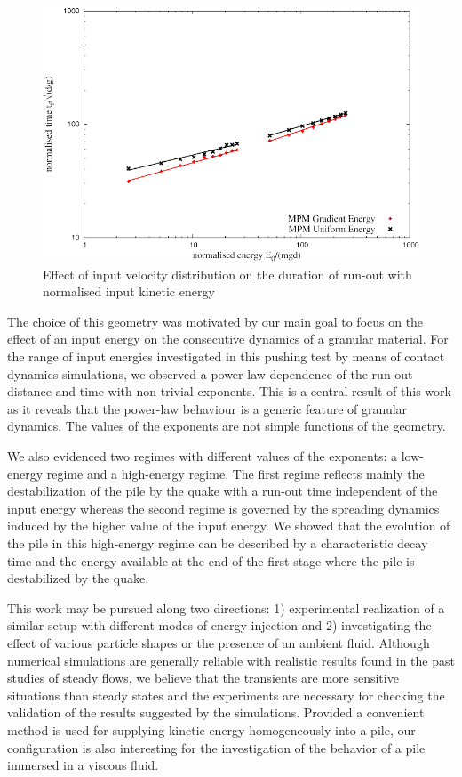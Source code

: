 \begin{figure}[tbph]
\centering
\includegraphics[width=\textwidth]{time_Eo_GU}
\caption{Effect of input velocity distribution on the duration of run-out with 
normalised input kinetic energy}
\label{fig:time_Eo_GU}
\end{figure}



The choice of this geometry was motivated by our main goal  to focus on the 
effect of an input energy on the consecutive dynamics of a granular material.
For the range of input energies investigated in this pushing test by means of 
contact dynamics simulations, we observed a power-law dependence of the 
run-out distance and time with non-trivial exponents. This is a central result 
of this work as it reveals that the power-law behaviour is a generic feature of 
granular dynamics. The values of the exponents are not simple functions of 
the geometry. 

We also evidenced two regimes with different values of the exponents: 
a low-energy regime and a high-energy regime. The first regime  
reflects mainly the destabilization of the pile by the quake with a run-out time 
independent of the input energy whereas the second regime is governed by the 
spreading dynamics induced by the higher value of the input energy. We showed 
that the evolution of the pile in this high-energy regime can be described by a 
characteristic decay time and the energy available at the end of the first 
stage where the pile is destabilized by the quake. 

This work may be pursued along two directions: 1) experimental 
realization of a similar setup with different modes of energy injection and 
2) investigating the effect of various particle shapes or the presence of an 
ambient fluid. Although numerical simulations are generally reliable 
with realistic results found in the past studies of steady flows, we believe 
that the transients are more sensitive situations than steady states and the  
experiments are necessary for checking the validation of the results suggested 
by the simulations. Provided a convenient method is used for supplying kinetic 
energy homogeneously into a pile, our configuration is also interesting for 
the investigation of the behavior of a pile immersed in a viscous 
fluid.

